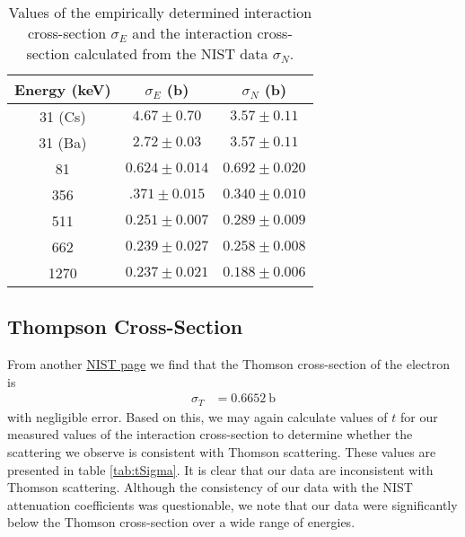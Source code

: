 \documentclass[letter]{article}
\begin{document}
\begin{table}[h] 
\centering  \begin{tabular}{ c  c   c  } 
Energy (\unit{\kilo\electronvolt}) & $\sigma_E$ (\unit{\barn}) & $\sigma_N$ (\unit{\barn}) \\ \hline
31 (Cs) & $\num{4.67} \pm \num{0.70}$ & $\num{3.57} \pm \num{0.11}$ \\ 
31 (Ba) &$ \num{2.72}\pm\num{0.03} $&$ \num{3.57}\pm\num{0.11}$ \\
81 &  $\num{0.624}\pm\num{0.014}$ & $\num{0.692}\pm\num{0.020}$ \\
356 & $\num{.371}\pm\num{0.015}$ & $\num{0.340}\pm\num{0.010}$ \\
511 & $\num{0.251}\pm 0.007$ & $0.289 \pm 0.009 $\\
662 &  $0.239 \pm 0.027$ & $0.258 \pm 0.008 $\\
1270 &  $0.237 \pm 0.021$ &$ 0.188 \pm 0.006$
\end{tabular}
\caption{Values of the empirically determined interaction cross-section $\sigma_E$ and the interaction cross-section calculated from the NIST data $\sigma_N$.}
\label{tab:XSections}
\end{table}

\subsection{Thompson Cross-Section}

From another \href{https://physics.nist.gov/cgi-bin/cuu/Value?sigmae}{NIST page} we find that the Thomson cross-section of the electron is 
\begin{align} \label{eqn:ThomsonXSec}
\sigma_T &= \qty{0.6652}{\barn}
\end{align}
with negligible error. Based on this, we may again calculate values of $t$ for our measured values of the interaction cross-section to determine whether the scattering we observe is consistent with Thomson scattering. These values are presented in table \ref{tab:tSigma}. It is clear that our data are inconsistent with Thomson scattering. Although the consistency of our data with the NIST attenuation coefficients was questionable, we note that our data were significantly below the Thomson cross-section over a wide range of energies.
\end{document}
